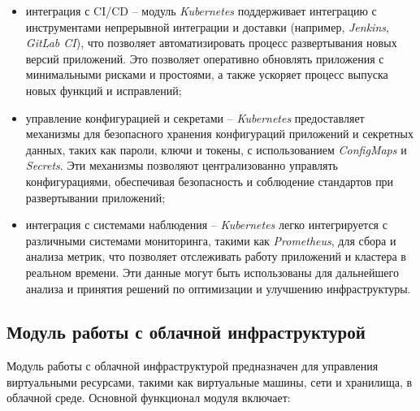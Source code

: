 \begin{itemize}
    \item интеграция с CI/CD -- модуль \textit{Kubernetes} поддерживает интеграцию с инструментами непрерывной интеграции и доставки (например, \textit{Jenkins}, \textit{GitLab CI}), что позволяет автоматизировать процесс развертывания новых версий приложений. Это позволяет оперативно обновлять приложения с минимальными рисками и простоями, а также ускоряет процесс выпуска новых функций и исправлений;
    \item управление конфигурацией и секретами -- \textit{Kubernetes} предоставляет механизмы для безопасного хранения конфигураций приложений и секретных данных, таких как пароли, ключи и токены, с использованием \textit{ConfigMaps} и \textit{Secrets}. Эти механизмы позволяют централизованно управлять конфигурациями, обеспечивая безопасность и соблюдение стандартов при развертывании приложений;
    \item интеграция с системами наблюдения -- \textit{Kubernetes} легко интегрируется с различными системами мониторинга, такими как \textit{Prometheus}, для сбора и анализа метрик, что позволяет отслеживать работу приложений и кластера в реальном времени. Эти данные могут быть использованы для дальнейшего анализа и принятия решений по оптимизации и улучшению инфраструктуры.
\end{itemize}

\subsection{Модуль работы с облачной инфраструктурой}
\label{sec:cloud_infrastructure_functionality}

Модуль работы с облачной инфраструктурой предназначен для управления виртуальными ресурсами, такими как виртуальные машины, сети и хранилища, в облачной среде. Основной функционал модуля включает:

